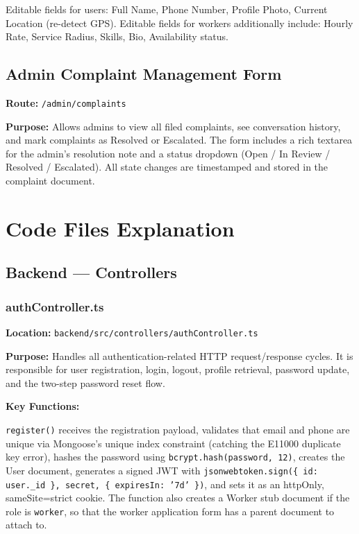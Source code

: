 \documentclass[12pt,a4paper]{report}
\begin{document}
Editable fields for users: Full Name, Phone Number, Profile Photo, Current Location (re-detect GPS). Editable fields for workers additionally include: Hourly Rate, Service Radius, Skills, Bio, Availability status.

\section{Admin Complaint Management Form}

\textbf{Route:} \texttt{/admin/complaints}

\textbf{Purpose:} Allows admins to view all filed complaints, see conversation history, and mark complaints as Resolved or Escalated. The form includes a rich textarea for the admin's resolution note and a status dropdown (Open / In Review / Resolved / Escalated). All state changes are timestamped and stored in the complaint document.

\chapter{Code Files Explanation}

\section{Backend — Controllers}

\subsection{authController.ts}

\textbf{Location:} \texttt{backend/src/controllers/authController.ts}

\textbf{Purpose:} Handles all authentication-related HTTP request/response cycles. It is responsible for user registration, login, logout, profile retrieval, password update, and the two-step password reset flow.

\textbf{Key Functions:}

\texttt{register()} receives the registration payload, validates that email and phone are unique via Mongoose's unique index constraint (catching the E11000 duplicate key error), hashes the password using \texttt{bcrypt.hash(password, 12)}, creates the User document, generates a signed JWT with \texttt{jsonwebtoken.sign(\{ id: user.\_id \}, secret, \{ expiresIn: '7d' \})}, and sets it as an httpOnly, sameSite=strict cookie. The function also creates a Worker stub document if the role is \texttt{worker}, so that the worker application form has a parent document to attach to.
\end{document}
